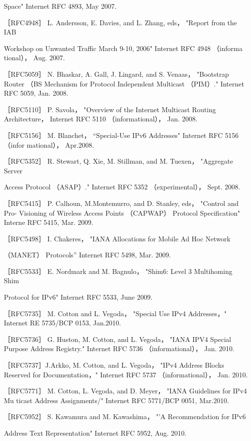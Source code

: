 Space" Internet RFC 4893, May 2007.

［RFC4948］ L. Andersson, E. Davies, and L. Zhang, eds， "Report from the IAB

Workshop on Unwanted Traffic March 9-10, 2006" Internet RFC 4948 （informa
tional）， Aug. 2007.

［RFC5059］ N. Bhaskar, A. Gall, J. Lingard, and S. Venaas， "Bootstrap Router （BS
Mechanism for Protocol Independent Multicast （PIM）." Internet RFC 5059, Jan.
2008.

［RFC5110］ P. Savola， "Overview of the Internet Multicast Routing Architecture，
Internet RFC 5110 （informational）， Jan. 2008.

［RFC5156］ M. Blanchet， “Special-Use IPv6 Addresses" Internet RFC 5156 （infor
mational）， Apr.2008.

［RFC5352］ R. Stewart, Q. Xie, M. Stillman, and M. Tuexen， "Aggregate Server

Access Protocol （ASAP）." Internet RFC 5352 （experimental）， Sept. 2008.

［RFC5415］ P. Calhoun, M.Montemurro, and D. Stanley, eds， "Control and Pro-
Visioning of Wireless Access Points （CAPWAP） Protocol Specification" Interne
RFC 5415, Mar. 2009.

［RFC5498］ I. Chakeres， "IANA Allocations for Mobile Ad Hoc Network

（MANET） Protocols” Internet RFC 5498, Mar. 2009.

［RFC5533］ E. Nordmark and M. Bagnulo， "Shim6: Level 3 Multihoming Shim

Protocol for IPv6" Internet RFC 5533, June 2009.

［RFC5735］ M. Cotton and L. Vegoda， "Special Use IPv4 Addresses，" Internet RE
5735/BCP 0153, Jan.2010.

［RFC5736］ G. Huston, M. Cotton, and L. Vegoda， "IANA IPV4 Special Purpose
Address Registry." Internet RFC 5736 （informational）， Jan. 2010.

［RFC5737］J.Arkko, M. Cotton, and L. Vegoda， "IPv4 Address Blocks Reserved
for Documentation，" Internet RFC 5737 （informational）， Jan. 2010.

［RFC5771］ M. Cotton, L. Vegoda, and D. Meyer， "IANA Guidelines for IPv4 Mu
ticast Address Assignments/" Internet RFC 5771/BCP 0051, Mar.2010.

［RFC5952］ S. Kawamura and M. Kawashima， "'A Recommendation for IPv6

Address Text Representation" Internet RFC 5952, Aug. 2010.

